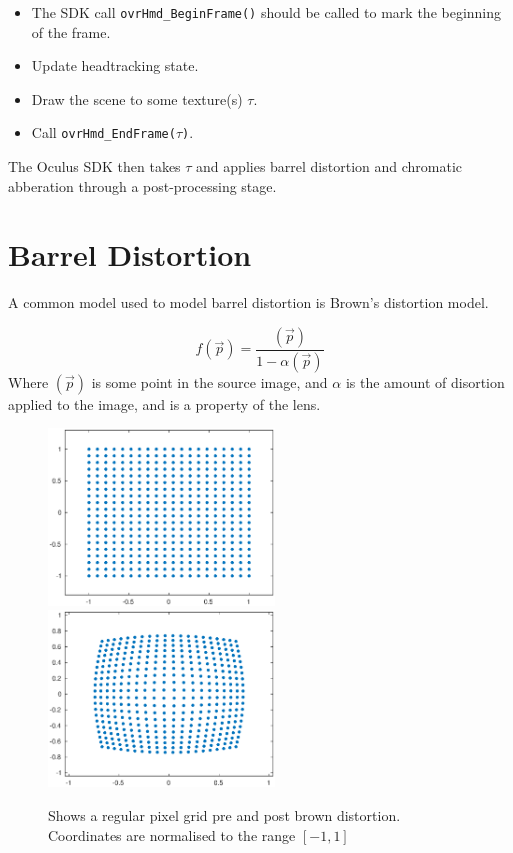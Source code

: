 \documentclass[12pt,a4paper,twoside,openright]{report}
\begin{document}
\begin{itemize}
  \item The SDK call \texttt{ovrHmd\_BeginFrame()} should be called to mark the beginning of the frame.
  \item Update headtracking state.
  \item Draw the scene to some texture(s) $\tau$.
  \item Call \texttt{ovrHmd\_EndFrame($\tau$)}.
\end{itemize}

The Oculus SDK then takes $\tau$ and applies barrel distortion and chromatic abberation through a post-processing stage. 

\section{Barrel Distortion}

A common model used to model barrel distortion is Brown's distortion model. 

\[
f(\vec p) = \frac{(\vec p)}{1-\alpha(\vec p)}
\]
Where $(\vec p)$ is some point in the source image, and $\alpha$ is the amount of disortion applied to the image, and is a property of the lens.


\begin{figure}[tbh]
\begin{center}
\includegraphics[width=6cm]{figs/pre_distortion.eps}
\includegraphics[width=6cm]{figs/post_distortion.eps}
\caption{Shows a regular pixel grid pre and post brown distortion. Coordinates are normalised to the range $[-1,1]$}
\label{epsfig1}
\end{center}
\end{figure}
\end{document}
